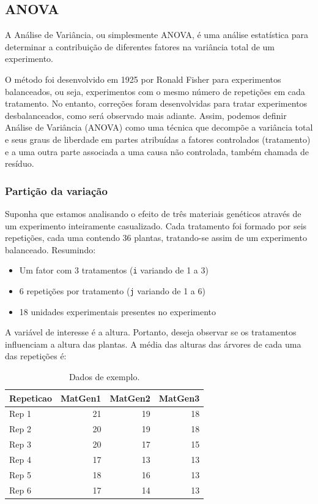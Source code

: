 \documentclass[
]{article}
\providecommand{\tightlist}{%
  \setlength{\itemsep}{0pt}\setlength{\parskip}{0pt}}
\begin{document}
\hypertarget{anova}{%
\subsection{ANOVA}\label{anova}}

A Análise de Variância, ou simplesmente ANOVA, é uma análise estatística para determinar a contribuição de diferentes fatores na variância total de um experimento.

O método foi desenvolvido em 1925 por Ronald Fisher para experimentos balanceados, ou seja, experimentos com o mesmo número de repetições em cada tratamento. No entanto, correções foram desenvolvidas para tratar experimentos desbalanceados, como será observado mais adiante. Assim, podemos definir Análise de Variância (ANOVA) como uma técnica que decompõe a variância total e seus graus de liberdade em partes atribuídas a fatores controlados (tratamento) e a uma outra parte associada a uma causa não controlada, também chamada de resíduo.

\hypertarget{partiuxe7uxe3o-da-variauxe7uxe3o}{%
\subsubsection{Partição da variação}\label{partiuxe7uxe3o-da-variauxe7uxe3o}}

Suponha que estamos analisando o efeito de três materiais genéticos através de um experimento inteiramente casualizado. Cada tratamento foi formado por seis repetições, cada uma contendo 36 plantas, tratando-se assim de um experimento balanceado. Resumindo:

\begin{itemize}
\tightlist
\item
  Um fator com 3 tratamentos (\texttt{i} variando de 1 a 3)
\item
  6 repetições por tratamento (\texttt{j} variando de 1 a 6)
\item
  18 unidades experimentais presentes no experimento
\end{itemize}

A variável de interesse é a altura. Portanto, deseja observar se os tratamentos influenciam a altura das plantas. A média das alturas das árvores de cada uma das repetições é:

\begin{table}

\caption{\label{tab:unnamed-chunk-1}Dados de exemplo.}
\centering
\begin{tabular}[t]{l|r|r|r}
\hline
Repeticao & MatGen1 & MatGen2 & MatGen3\\
\hline
Rep 1 & 21 & 19 & 18\\
\hline
Rep 2 & 20 & 19 & 18\\
\hline
Rep 3 & 20 & 17 & 15\\
\hline
Rep 4 & 17 & 13 & 13\\
\hline
Rep 5 & 18 & 16 & 13\\
\hline
Rep 6 & 17 & 14 & 13\\
\hline
\end{tabular}
\end{table}
\end{document}
